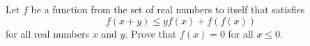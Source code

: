 Let $f$ be a function from the set of real numbers to itself that satisfies
\[
f(x+y) \leq y f(x) + f(f(x))
\]
for all real numbers $x$ and $y$. Prove that $f(x) = 0$ for all $x \leq 0$.
